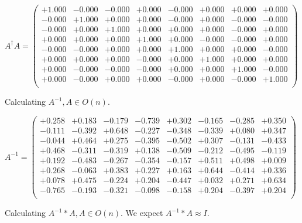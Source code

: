 \documentclass[9pt]{article}
\theoremstyle{plain}
\theoremstyle{definition}
\theoremstyle{remark}
\numberwithin{equation}{section}
\begin{document}
$A^{\dag} A = \left(
\begin{array}{
cccccccc}
+1.000 & -0.000 & -0.000 & +0.000 & -0.000 & +0.000 & +0.000 & +0.000 \\
-0.000 & +1.000 & +0.000 & +0.000 & -0.000 & +0.000 & -0.000 & -0.000 \\
-0.000 & +0.000 & +1.000 & +0.000 & +0.000 & +0.000 & -0.000 & +0.000 \\
+0.000 & +0.000 & +0.000 & +1.000 & +0.000 & -0.000 & -0.000 & +0.000 \\
-0.000 & -0.000 & +0.000 & +0.000 & +1.000 & +0.000 & +0.000 & -0.000 \\
+0.000 & +0.000 & +0.000 & -0.000 & +0.000 & +1.000 & +0.000 & +0.000 \\
+0.000 & -0.000 & -0.000 & -0.000 & +0.000 & +0.000 & +1.000 & -0.000 \\
+0.000 & -0.000 & +0.000 & +0.000 & -0.000 & +0.000 & -0.000 & +1.000 \\
\end{array}
\right)$ \newline 

Calculating $A^{-1} ,  A \in O(n)$.

$A^{-1} = \left(
\begin{array}{
cccccccc}
+0.258 & +0.183 & -0.179 & -0.739 & +0.302 & -0.165 & -0.285 & +0.350 \\
-0.111 & -0.392 & +0.648 & -0.227 & -0.348 & -0.339 & +0.080 & +0.347 \\
-0.044 & +0.464 & +0.275 & -0.395 & -0.502 & +0.307 & -0.131 & -0.433 \\
+0.468 & -0.311 & -0.319 & +0.138 & -0.509 & -0.212 & -0.495 & -0.119 \\
+0.192 & -0.483 & -0.267 & -0.354 & -0.157 & +0.511 & +0.498 & +0.009 \\
+0.268 & -0.063 & +0.383 & +0.227 & +0.163 & +0.644 & -0.414 & +0.336 \\
+0.078 & +0.475 & -0.224 & +0.204 & -0.447 & +0.032 & +0.271 & +0.634 \\
-0.765 & -0.193 & -0.321 & -0.098 & -0.158 & +0.204 & -0.397 & +0.204 \\
\end{array}
\right)$ \newline 

Calculating $A^{-1} *A  ,  A \in O(n)$.   We expect $A^{-1} *A  \approx I$. 
\end{document}
